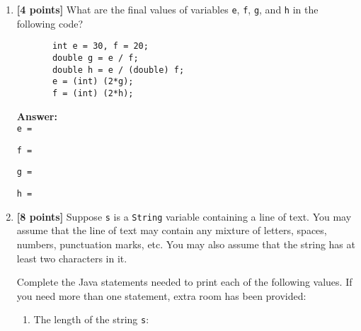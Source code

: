 \documentclass[11pt]{report}
\begin{document}
\begin{enumerate}




















\newpage

\item {\bf [4 points]}
What are the final values of variables {\tt e}, {\tt f}, {\tt g}, and
{\tt h} in the following code?
\begin{verbatim}
       int e = 30, f = 20;
       double g = e / f;
       double h = e / (double) f;
       e = (int) (2*g);
       f = (int) (2*h);
\end{verbatim}
{\bf Answer:}\\
\verb$e = $\underline{\hspace{.5in}}

\bigskip
\verb$f = $\underline{\hspace{.5in}}

\bigskip
\verb$g = $\underline{\hspace{.5in}}

\bigskip
\verb$h = $\underline{\hspace{.5in}}

\bigskip
\item {\bf [8 points]}
Suppose {\tt s} is a {\tt String} variable containing a line of text.
You may assume that the line of text may contain any mixture of
letters, spaces, numbers, punctuation marks, etc. You may also assume
that the string has at least two characters in it.

Complete the Java statements needed to print each of the following
values. If you need
more than one statement, extra room has been provided:
\begin{enumerate}
\item
The length of the string {\tt s}:


\end{enumerate}
\end{enumerate}
\end{document}
